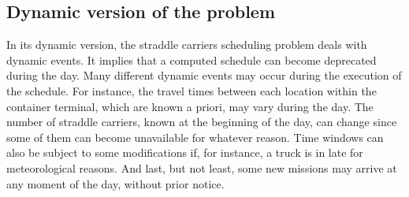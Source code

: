 \documentclass[a4paper,12pt]{article}
\begin{document}
%



\subsection{Dynamic version of the problem}

In its dynamic version, the straddle carriers scheduling problem deals with dynamic events. It implies that a computed schedule can become deprecated during the day. Many different dynamic events may occur during the execution of the schedule. For instance, the travel times between each location within the container terminal, which are known a priori, may vary during the day. The number of straddle carriers, known at the beginning of the day, can change since some of them can become unavailable for whatever reason. Time windows can also be subject to some modifications if, for instance, a truck is in late for meteorological reasons. And last, but not least, some new missions may arrive at any moment of the day, without prior notice.\\
\end{document}
